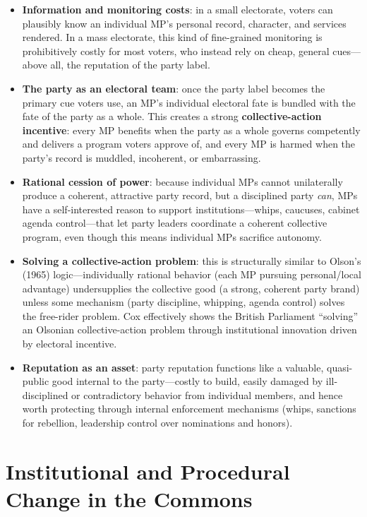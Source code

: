 \documentclass[12pt]{article}
\begin{document}
\begin{itemize}[leftmargin=*, itemsep=4pt]
    \item \textbf{Information and monitoring costs}: in a small electorate, voters can plausibly know an individual MP's personal record, character, and services rendered. In a mass electorate, this kind of fine-grained monitoring is prohibitively costly for most voters, who instead rely on cheap, general cues---above all, the reputation of the party label.
    \item \textbf{The party as an electoral team}: once the party label becomes the primary cue voters use, an MP's individual electoral fate is bundled with the fate of the party as a whole. This creates a strong \textbf{collective-action incentive}: every MP benefits when the party as a whole governs competently and delivers a program voters approve of, and every MP is harmed when the party's record is muddled, incoherent, or embarrassing.
    \item \textbf{Rational cession of power}: because individual MPs cannot unilaterally produce a coherent, attractive party record, but a disciplined party \emph{can}, MPs have a self-interested reason to support institutions---whips, caucuses, cabinet agenda control---that let party leaders coordinate a coherent collective program, even though this means individual MPs sacrifice autonomy.
    \item \textbf{Solving a collective-action problem}: this is structurally similar to Olson's (1965) logic---individually rational behavior (each MP pursuing personal/local advantage) undersupplies the collective good (a strong, coherent party brand) unless some mechanism (party discipline, whipping, agenda control) solves the free-rider problem. Cox effectively shows the British Parliament ``solving'' an Olsonian collective-action problem through institutional innovation driven by electoral incentive.
    \item \textbf{Reputation as an asset}: party reputation functions like a valuable, quasi-public good internal to the party---costly to build, easily damaged by ill-disciplined or contradictory behavior from individual members, and hence worth protecting through internal enforcement mechanisms (whips, sanctions for rebellion, leadership control over nominations and honors).
\end{itemize}

\section{Institutional and Procedural Change in the Commons}
\end{document}

